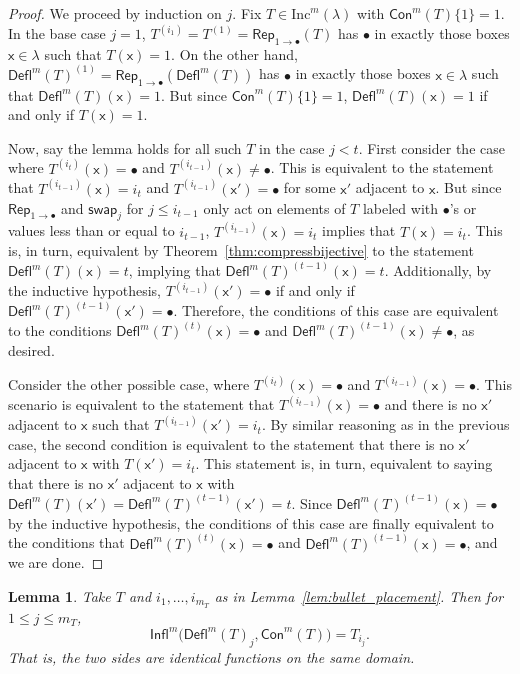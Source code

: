 \documentclass[12pt]{amsart}
\newcommand{\x}{\ensuremath{\mathsf{x}}}
\newtheorem{lemma}[theorem]{Lemma}
\theoremstyle{definition}
\theoremstyle{remark}
\numberwithin{equation}{section}
\newcommand{\inc}{\ensuremath{\mathrm{Inc}}}
\newcommand{\swap}{\ensuremath{\mathsf{swap}}}
\newcommand{\rep}{\ensuremath{\mathsf{Rep}}}
\newcommand{\deflate}{\ensuremath{\mathsf{Defl}}}
\newcommand{\tinflate}{\ensuremath{\mathsf{Infl}}}
\newcommand{\content}{\ensuremath{\mathsf{Con}}}
\begin{document}
\begin{proof} We proceed by induction on $j$. Fix $T \in \inc^m(\lambda)$  with $\content^m(T) \lbrace 1 \rbrace = 1$. In the base case $j = 1$,  $T^{(i_1)} = T^{(1)} = \rep_{1 \rightarrow \bullet}(T)$ has $\bullet$ in exactly those boxes $\x \in \lambda$ such that $T(\x) = 1$. On the other hand, $\deflate^m(T)^{(1)} =  \rep_{1 \rightarrow \bullet}(\deflate^m(T))$ has $\bullet$ in exactly those boxes $\x \in \lambda$ such that $\deflate^m(T)(\x) = 1$. But since $\content^m(T) \lbrace 1 \rbrace = 1$, $\deflate^m(T)(\x) = 1$ if and only if $T(\x) = 1$. 


Now, say the lemma holds for all such $T$ in the case $j < t$. First consider the case where $T^{(i_t)}(\x) = \bullet$ and $T^{(i_{t-1})}(\x) \neq \bullet$. This is equivalent to the statement that $T^{(i_{t-1})}(\x) = i_t$ and $T^{(i_{t-1})}(\x') = \bullet$ for some $\x'$ adjacent to $\x$. But since $\rep_{1 \rightarrow \bullet}$ and $\swap_j$ for  $j \leq i_{t-1}$ only act on elements of $T$ labeled with $\bullet$'s or values less than or equal to $i_{t-1}$, $T^{(i_{t-1})}(\x) = i_t$ implies that $T(\x) = i_t$. This is, in turn, equivalent by Theorem~\ref{thm:compressbijective} to the statement $\deflate^m(T)(\x) = t$, implying that $\deflate^m(T)^{(t-1)}(\x) = t$. Additionally, by the inductive hypothesis, $T^{(i_{t-1})}(\x') = \bullet$ if and only if $\deflate^m(T)^{(t-1)}(\x') = \bullet$. Therefore, the conditions of this case are equivalent to the conditions $\deflate^m(T)^{(t)}(\x) = \bullet$ and $\deflate^m(T)^{(t-1)}(\x) \neq \bullet$, as desired. 

Consider the other possible case, where $T^{(i_t)}(\x) = \bullet$ and $T^{(i_{t-1})}(\x) = \bullet$. This scenario is equivalent to the statement that $T^{(i_{t-1})}(\x) = \bullet$ and there is no $\x'$ adjacent to $\x$ such that $T^{(i_{t-1})}(\x') = i_t$. By similar reasoning as in the previous case, the second condition is equivalent to the statement that there is no $\x'$ adjacent to $\x$ with $T(\x') = i_t$. This statement is, in turn, equivalent to saying that there is no $\x'$ adjacent to $\x$ with $\deflate^m(T)(\x') = \deflate^m(T)^{(t-1)}(\x') = t$. Since $\deflate^m(T)^{(t-1)}(\x) = \bullet$ by the inductive hypothesis, the conditions of this case are finally equivalent to the conditions that $\deflate^m(T)^{(t)}(\x) = \bullet$ and $\deflate^m(T)^{(t-1)}(\x) = \bullet$, and we are done.
\end{proof}
\begin{lemma} \label{lem:gappy_promotion}
Take $T$ and $i_1, \ldots, i_{m_T}$ as in Lemma~\ref{lem:bullet_placement}. Then for $1 \leq j \leq m_T$, 
\begin{equation}\label{eq:gappy_promotion}
 \tinflate^m \Big( \deflate^m(T)_j, \content^m(T) \Big) = T_{i_j}.
\end{equation}
That is, the two sides are identical functions on the same domain. 
\end{lemma}
\end{document}
